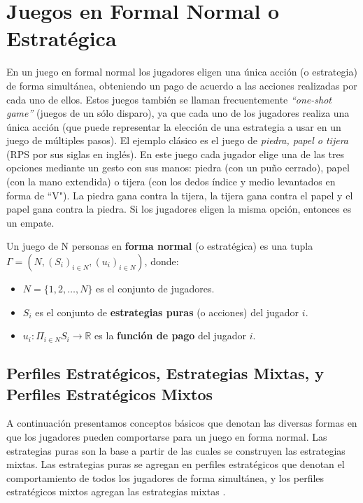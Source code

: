 \chapter{Juegos en Formal Normal o Estratégica}
\label{chapter:forma-normal}

En un juego en formal normal los jugadores eligen una única acción (o estrategia) de forma simultánea, obteniendo un pago de acuerdo a las acciones realizadas por cada uno de ellos. Estos juegos también se llaman frecuentemente \textit{``one-shot game''}   (juegos de un sólo disparo), ya que cada uno de los jugadores realiza una única acción \cite{bib:introductionCFR} (que puede representar la elección de una estrategia a usar en un juego de múltiples pasos). El ejemplo clásico es el juego de \textit{piedra, papel o tijera} (RPS por sus siglas en inglés). En este juego cada jugador elige una de las tres opciones mediante un gesto con sus manos: piedra (con un puño cerrado), papel (con la mano extendida) o tijera (con los dedos índice y medio levantados en forma de ``V"). La piedra gana contra la tijera, la tijera gana contra el papel y el papel gana contra la piedra. Si los jugadores eligen la misma opción, entonces es un empate.

\begin{definition}
\label{def:forma-normal}
Un juego de N personas en \textbf{forma normal} (o estratégica) es una tupla $\Gamma = (N, (S_i)_{i \in N}, (u_i)_{i \in N})$, donde:
	\begin{itemize}[]
		\item $N = \{1, 2, \dots, N\}$ es el conjunto de jugadores.
		\item  $S_i$ es el conjunto de \textbf{estrategias puras} (o acciones) del jugador $i$.
		\item $u_i : \Pi _{i \in N} S_i \rightarrow \mathbb{R}$ es la \textbf{función de pago} del jugador $i$.
	\end{itemize}
\end{definition}

\section{Perfiles Estratégicos, Estrategias Mixtas, y Perfiles Estratégicos Mixtos}
A continuación presentamos conceptos básicos que denotan las diversas formas en que los jugadores pueden comportarse para un juego en forma normal. Las estrategias puras son la base a partir de las cuales se construyen las estrategias mixtas. Las estrategias puras se agregan en perfiles estratégicos que denotan el comportamiento de todos los jugadores de forma simultánea, y los perfiles estratégicos mixtos agregan las estrategias mixtas \cite{bib:tutorial-existence-nash}.

